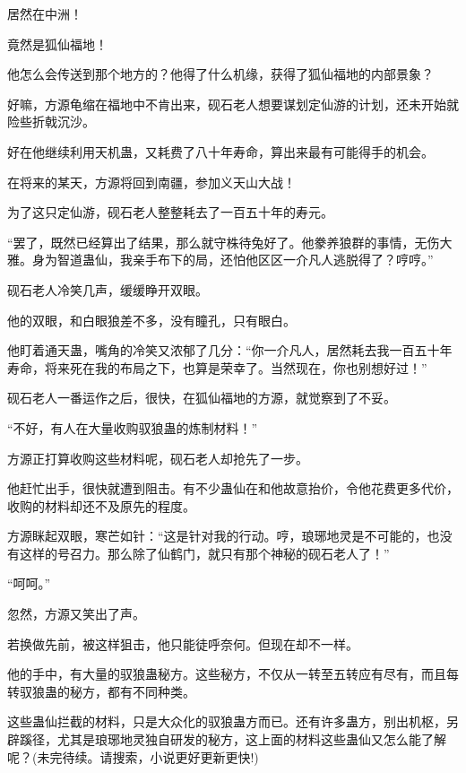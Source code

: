 \begin{this_body}
居然在中洲！

竟然是狐仙福地！

他怎么会传送到那个地方的？他得了什么机缘，获得了狐仙福地的内部景象？

好嘛，方源龟缩在福地中不肯出来，砚石老人想要谋划定仙游的计划，还未开始就险些折戟沉沙。

好在他继续利用天机蛊，又耗费了八十年寿命，算出来最有可能得手的机会。

在将来的某天，方源将回到南疆，参加义天山大战！

为了这只定仙游，砚石老人整整耗去了一百五十年的寿元。

“罢了，既然已经算出了结果，那么就守株待兔好了。他豢养狼群的事情，无伤大雅。身为智道蛊仙，我亲手布下的局，还怕他区区一介凡人逃脱得了？哼哼。”

砚石老人冷笑几声，缓缓睁开双眼。

他的双眼，和白眼狼差不多，没有瞳孔，只有眼白。

他盯着通天蛊，嘴角的冷笑又浓郁了几分：“你一介凡人，居然耗去我一百五十年寿命，将来死在我的布局之下，也算是荣幸了。当然现在，你也别想好过！”

砚石老人一番运作之后，很快，在狐仙福地的方源，就觉察到了不妥。

“不好，有人在大量收购驭狼蛊的炼制材料！”

方源正打算收购这些材料呢，砚石老人却抢先了一步。

他赶忙出手，很快就遭到阻击。有不少蛊仙在和他故意抬价，令他花费更多代价，收购的材料却还不及原先的程度。

方源眯起双眼，寒芒如针：“这是针对我的行动。哼，琅琊地灵是不可能的，也没有这样的号召力。那么除了仙鹤门，就只有那个神秘的砚石老人了！”

“呵呵。”

忽然，方源又笑出了声。

若换做先前，被这样狙击，他只能徒呼奈何。但现在却不一样。

他的手中，有大量的驭狼蛊秘方。这些秘方，不仅从一转至五转应有尽有，而且每转驭狼蛊的秘方，都有不同种类。

这些蛊仙拦截的材料，只是大众化的驭狼蛊方而已。还有许多蛊方，别出机枢，另辟蹊径，尤其是琅琊地灵独自研发的秘方，这上面的材料这些蛊仙又怎么能了解呢？(未完待续。请搜索，小说更好更新更快!)

\end{this_body}

